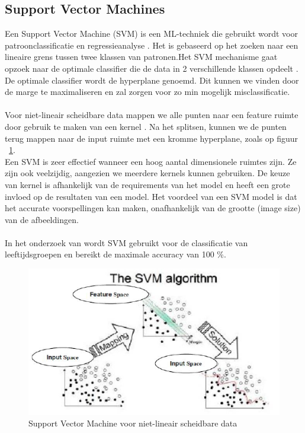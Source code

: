 \subsection{Support Vector Machines} \label{sub:svm}
Een Support Vector Machine (SVM) is een ML-techniek die gebruikt wordt voor patroonclassificatie en regressieanalyse \autocite{Chen2011}. Het is gebaseerd op het zoeken naar een lineaire grens tussen twee klassen van patronen.Het SVM mechanisme gaat opzoek naar de optimale classifier die de data in 2 verschillende klassen opdeelt \autocite{Rustam2018}. De optimale classifier wordt de hyperplane genoemd. Dit kunnen we vinden door de marge te maximaliseren en zal zorgen voor zo min mogelijk misclassificatie. \\
\\
Voor niet-lineair scheidbare data mappen we alle punten naar een feature ruimte door gebruik te maken van een kernel \autocite{Shah2012}. Na het splitsen, kunnen we de punten terug mappen naar de input ruimte met een kromme hyperplane, zoals op figuur {~\ref{fig:svm}}. \\
Een SVM is zeer effectief wanneer een hoog aantal dimensionele ruimtes zijn. Ze zijn ook veelzijdig, aangezien we meerdere kernels kunnen gebruiken. De keuze van kernel is afhankelijk van de requirements van het model en heeft een grote invloed op de resultaten van een model. Het voordeel van een SVM model is dat het accurate voorspellingen kan maken, onafhankelijk van de grootte (image size) van de afbeeldingen. \autocite{Khan2011} \\
\\
In het onderzoek van \textcite{Rustam2018} wordt SVM gebruikt voor de classificatie van leeftijdsgroepen en bereikt de maximale accuracy van 100 \%.
\begin{figure}
    \centering
    \includegraphics{graphics/svm-non-lineair.PNG}
    \caption[SVM]{\label{fig:svm}Support Vector Machine voor niet-lineair scheidbare data}
\end{figure}

